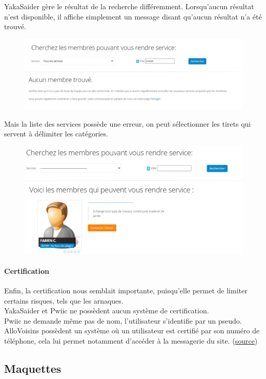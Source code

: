 \documentclass[a4paper,11pt]{article}
\begin{document}
YakaSaider gère le résultat de la recherche différemment. Lorsqu’aucun résultat n’est disponible,
il affiche simplement un message disant qu’aucun résultat n’a été trouvé.\\

\begin{figure}[H]
  \includegraphics[width=\linewidth]{images/pas-trouve-yakasaider.png}
  \label{fig:pas-trouve-yakasaider}
\end{figure}

Mais la liste des services possède une erreur, on peut sélectionner les tirets qui servent à délimiter les catégories.\\

\begin{figure}[H]
  \includegraphics[width=\linewidth]{images/erreur-yakasaider.png}
  \label{fig:erreur-yakasaider}
\end{figure}

\paragraph{Certification}

Enfin, la certification nous semblait importante, puisqu’elle permet de limiter certains risques, tels que les arnaques.\\

YakaSaider et Pwiic ne possèdent aucun système de certification.\\

Pwiic ne demande même pas de nom, l’utilisateur s’identifie par un pseudo.\\

AlloVoisins possèdent un système où un utilisateur est certifié par son numéro de téléphone,
cela lui permet notamment d’accéder à la messagerie du site. (\href{https://support.allovoisins.com/hc/fr/articles/360000816614-Pourquoi-dois-je-certifier-mon-num%C3%A9ro-de-mobile-pour-pouvoir-acc%C3%A9der-%C3%A0-la-messagerie-}{source})

\subsection{Maquettes}
\end{document}
